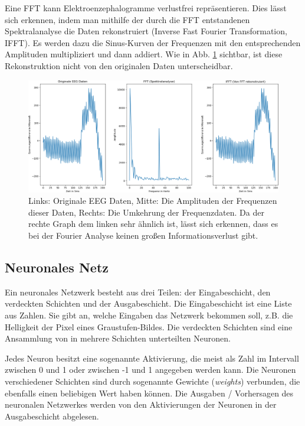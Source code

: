\documentclass[10pt]{article}
\newcommand{\eng}[1]{\textit{#1}}
\begin{document}
Eine FFT kann Elektroenzephalogramme verlustfrei repräsentieren.
Dies lässt sich erkennen, indem man mithilfe der durch die FFT entstandenen Spektralanalyse die Daten rekonstruiert (Inverse Fast Fourier Transformation, IFFT). 
Es werden dazu die Sinus-Kurven der Frequenzen mit den entsprechenden Amplituden multipliziert und dann addiert.
Wie in Abb. \ref{fig:ifft} sichtbar, ist diese Rekonstruktion nicht von den originalen Daten unterscheidbar. %

\begin{figure}[h!]
    \centering
    \includegraphics[width=0.8\linewidth]{pictures/blink_fft_ifft_cropped.png}
    \caption{Links: Originale EEG Daten, Mitte: Die Amplituden der Frequenzen dieser Daten, Rechts: Die Umkehrung der Frequenzdaten. Da der rechte Graph dem linken sehr ähnlich ist, lässt sich erkennen, dass es bei der Fourier Analyse keinen großen Informationsverlust gibt.}
    \label{fig:ifft}
\end{figure}

\subsection{Neuronales Netz}

Ein neuronales Netzwerk besteht aus drei Teilen: der Eingabeschicht, den verdeckten Schichten und der Ausgabeschicht. 
Die Eingabeschicht ist eine Liste aus Zahlen. 
Sie gibt an, welche Eingaben das Netzwerk bekommen soll, z.B. die Helligkeit der Pixel eines Graustufen-Bildes.
Die verdeckten Schichten sind eine Ansammlung von in mehrere Schichten unterteilten Neuronen.

Jedes Neuron besitzt eine sogenannte Aktivierung, die meist als Zahl im Intervall zwischen 0 und 1 oder zwischen  -1 und 1 angegeben werden kann. 
Die Neuronen verschiedener Schichten sind durch sogenannte Gewichte (\eng{weights}) verbunden, die ebenfalls einen beliebigen Wert haben können.
Die Ausgaben / Vorhersagen des neuronalen Netzwerkes werden von den Aktivierungen der Neuronen in der Ausgabeschicht abgelesen.
\end{document}
